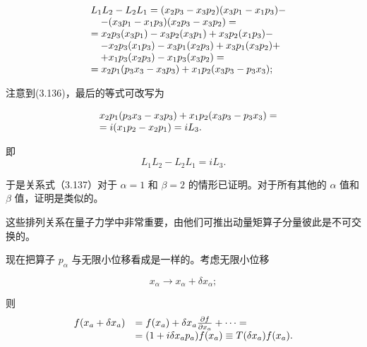 \begin{equation*}
\begin{array}{r l} & L _ {1} L _ {2} - L _ {2} L _ {1} = (x _ {2} p _ {3} - x _ {3} p _ {2}) (x _ {3} p _ {1} - x _ {1} p _ {3}) - \\ & \quad - (x _ {3} p _ {1} - x _ {1} p _ {3}) (x _ {2} p _ {3} - x _ {3} p _ {2}) = \\ & = x _ {2} p _ {3} (x _ {3} p _ {1}) - x _ {3} p _ {2} (x _ {3} p _ {1}) + x _ {3} p _ {2} (x _ {1} p _ {3}) - \\ & \quad - x _ {2} p _ {3} (x _ {1} p _ {3}) - x _ {3} p _ {1} (x _ {2} p _ {3}) + x _ {3} p _ {1} (x _ {3} p _ {2}) + \\ & \quad + x _ {1} p _ {3} (x _ {2} p _ {3}) - x _ {1} p _ {3} (x _ {3} p _ {2}) = \\ & = x _ {2} p _ {1} (p _ {3} x _ {3} - x _ {3} p _ {3}) + x _ {1} p _ {2} (x _ {3} p _ {3} - p _ {3} x _ {3}); \end{array}
\end{equation*}

注意到(3.136)，最后的等式可改写为

\begin{equation*}
\begin{array}{r l} & x _ {2} p _ {1} (p _ {3} x _ {3} - x _ {3} p _ {3}) + x _ {1} p _ {2} (x _ {3} p _ {3} - p _ {3} x _ {3}) = \\ & = i (x _ {1} p _ {2} - x _ {2} p _ {1}) = i L _ {3}. \end{array}
\end{equation*}

即
\begin{equation*}
L _ {1} L _ {2} - L _ {2} L _ {1} = i L _ {3}.
\end{equation*}

于是关系式（3.137）对于 $\alpha = 1$ 和 $\beta = 2$ 的情形已证明。对于所有其他的 $\alpha$ 值和 $\beta$ 值，证明是类似的。

这些排列关系在量子力学中非常重要，由他们可推出动量矩算子分量彼此是不可交换的。

现在把算子 $p_{\alpha}$ 与无限小位移看成是一样的。考虑无限小位移

\begin{equation*}
x _ {\alpha} \longrightarrow x _ {\alpha} + \delta x _ {\alpha};
\end{equation*}

则
\begin{equation*}
\begin{array}{r l} f (x _ {a} + \delta x _ {a}) & = f (x _ {a}) + \delta x _ {a} \frac {\partial f}{\partial x _ {a}} + \dots = \\ & = (1 + i \delta x _ {a} p _ {a}) f (x _ {a}) \equiv T (\delta x _ {a}) f (x _ {a}). \end{array}
\end{equation*}

